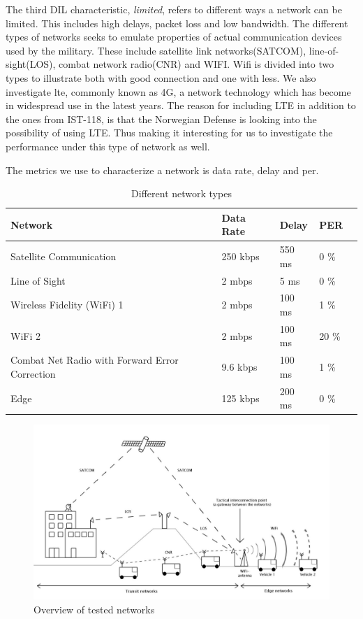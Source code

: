 The third DIL characteristic, \textit{limited}, refers to different ways a network
can be limited. This includes high delays, packet loss and low bandwidth. The
different types of networks seeks to emulate properties of actual communication
devices used by the military. These include satellite link networks(SATCOM),
line-of-sight(LOS), combat network radio(CNR) and WIFI. Wifi is divided into two
types to illustrate both with good connection and one with less. We also
investigate \gls{lte}, commonly known as 4G, a network technology which has
become in widespread use in the latest years. The reason for including LTE in
addition to the ones from IST-118, is that the Norwegian Defense is looking into
the possibility of using LTE. Thus making it interesting for us to investigate
the performance under this type of network as well.

The metrics we use to characterize a network is data rate, delay and \gls{per}.

\begin{table}[h]
\begin{tabular}{| l | l | l | l | l |}
\hline
  \textbf{Network} & \textbf{Data Rate} & \textbf{Delay} & \textbf{PER} \\ \hline
  Satellite Communication & 250 kbps & 550 ms & 0 \% \\ \hline
  Line of Sight & 2 mbps & 5 ms & 0 \% \\ \hline
  Wireless Fidelity (WiFi) 1 & 2 mbps & 100 ms & 1 \% \\ \hline
  WiFi 2 & 2 mbps & 100 ms & 20 \% \\ \hline
  Combat Net Radio with Forward Error Correction & 9.6 kbps & 100 ms & 1 \% \\ \hline
  Edge & 125 kbps & 200 ms & 0 \% \\ \hline
\end{tabular}
\caption{Different network types}
\label{table-network-types}
\end{table}

\begin{figure}[h]
\includegraphics[scale=0.25]{images/networks_overview.pdf}
\caption{Overview of tested networks}
\label{figure-networks-overview}
\end{figure}

